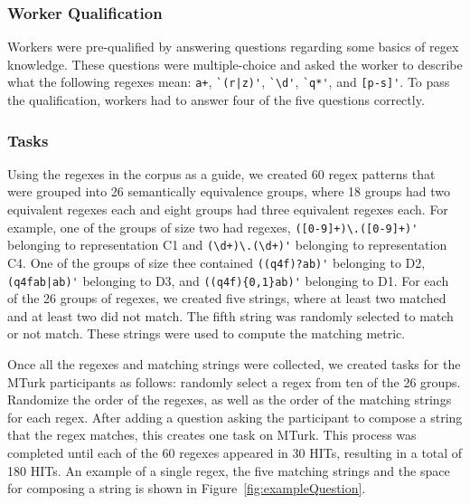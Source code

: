 \subsubsection{Worker Qualification}
Workers were pre-qualified by answering questions regarding some basics of regex knowledge. These questions were multiple-choice and asked the worker to describe what the following regexes mean: \verb!a+!, \verb!`(r|z)'!, \verb!`\d'!, \verb!`q*'!, and \verb![p-s]'!. To pass the qualification, workers had to answer four of the five questions correctly.

\subsubsection{Tasks}
Using the regexes in the corpus as a guide, we created 60 regex patterns that were grouped into 26 semantically equivalence groups, where 18 groups had two equivalent regexes each and eight groups had three equivalent regexes each. For example, one of the groups of size two had regexes, \verb!([0-9]+)\.([0-9]+)'! belonging to representation C1 and \verb!(\d+)\.(\d+)'! belonging to representation C4. One of the groups of size thee contained \verb!((q4f)?ab)'! belonging to D2, \verb!(q4fab|ab)'! belonging to D3, and \verb!((q4f){0,1}ab)'! belonging to D1.
For each of the 26 groups of regexes, we created five strings, where at least two matched and at least two did not match. The fifth string was randomly selected to match or not match. These strings were used to compute the matching metric.

Once all the regexes and matching strings were collected, we created tasks for the MTurk participants as follows: randomly select a regex from ten of the 26 groups. Randomize the order of the regexes, as well as the order of the matching strings for each regex. After adding a question asking the participant to compose a string that the regex matches, this creates one task on MTurk.   This process was completed until each of the 60 regexes appeared in 30 HITs, resulting in a total of 180 HITs.
An example of a single regex, the five matching strings and the space for composing a string is shown in Figure~\ref{fig:exampleQuestion}.


